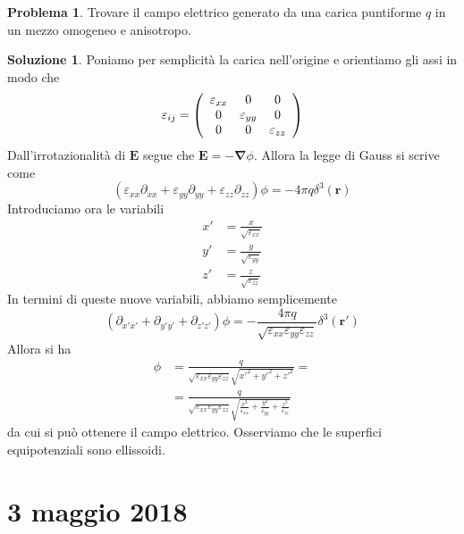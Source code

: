 \documentclass[a4paper,11pt]{book}
\let\oldnabla\nabla
\renewcommand{\nabla}{\vec{\oldnabla}}
\renewcommand{\vec}[1]{\mathbf{#1}}
\theoremstyle{theorem}
\theoremstyle{definition}
\newtheorem{problema}{Problema}[section]
\newtheorem{soluzione}{Soluzione}[section]
\begin{document}
\begin{problema}
	Trovare il campo elettrico generato da una carica puntiforme $q$ in un mezzo omogeneo e anisotropo.
\end{problema}
\begin{soluzione}
	Poniamo per semplicità la carica nell'origine e orientiamo gli assi in modo che
	\[\varepsilon_{ij}=\left(\begin{array}{c c c}
	\varepsilon_{xx}&0&0\\0&\varepsilon_{yy}&0\\0&0&\varepsilon_{zz}
	\end{array}\right)\]
	Dall'irrotazionalità di $\vec{E}$ segue che $\vec{E}=-\nabla\phi$. Allora la legge di Gauss si scrive come
	\[(\varepsilon_{xx}\partial_{xx}+\varepsilon_{yy}\partial_{yy}+\varepsilon_{zz}\partial_{zz})\phi=-4\pi q\delta^3(\vec{r})\]
	Introduciamo ora le variabili
	\begin{align*}
		x'&=\frac{x}{\sqrt{\varepsilon_{xx}}}\\y'&=\frac{y}{\sqrt{\varepsilon_{yy}}}\\z'&=\frac{z}{\sqrt{\varepsilon_{zz}}}
	\end{align*}
	In termini di queste nuove variabili, abbiamo semplicemente
	\[(\partial_{x'x'}+\partial_{y'y'}+\partial_{z'z'})\phi=-\frac{4\pi q}{\sqrt{\varepsilon_{xx}\varepsilon_{yy}\varepsilon_{zz}}}\delta^3(\vec{r}')\]Allora si ha
	\begin{align*}
		\phi&=\frac{q}{\sqrt{\varepsilon_{xx}\varepsilon_{yy}\varepsilon_{zz}}\sqrt{x'^2+y'^2+z'^2}}=\\&=\frac{q}{\sqrt{\varepsilon_{xx}\varepsilon_{yy}\varepsilon_{zz}}\sqrt{\frac{x^2}{\varepsilon_{xx}}+\frac{y^2}{\varepsilon_{yy}}+\frac{z^2}{\varepsilon_{zz}}}}
	\end{align*}
	da cui si può ottenere il campo elettrico. Osserviamo che le superfici equipotenziali sono ellissoidi.
\end{soluzione}
\newpage
\section{3 maggio 2018}
\end{document}
